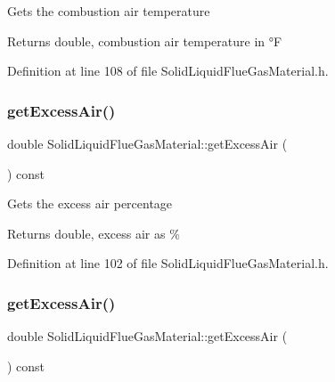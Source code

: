 Gets the combustion air temperature \begin{DoxyReturn}{Returns}
double, combustion air temperature in °F 
\end{DoxyReturn}


Definition at line 108 of file Solid\+Liquid\+Flue\+Gas\+Material.\+h.

\mbox{\label{class_solid_liquid_flue_gas_material_a49e7bb4ebc45897c81b6f38610ceaf02}} 
\subsubsection{\texorpdfstring{get\+Excess\+Air()}{getExcessAir()}\hspace{0.1cm}{\footnotesize\ttfamily [1/3]}}
{\footnotesize\ttfamily double Solid\+Liquid\+Flue\+Gas\+Material\+::get\+Excess\+Air (\begin{DoxyParamCaption}{ }\end{DoxyParamCaption}) const\hspace{0.3cm}{\ttfamily [inline]}}

Gets the excess air percentage \begin{DoxyReturn}{Returns}
double, excess air as \% 
\end{DoxyReturn}


Definition at line 102 of file Solid\+Liquid\+Flue\+Gas\+Material.\+h.

\mbox{\label{class_solid_liquid_flue_gas_material_a49e7bb4ebc45897c81b6f38610ceaf02}} 
\subsubsection{\texorpdfstring{get\+Excess\+Air()}{getExcessAir()}\hspace{0.1cm}{\footnotesize\ttfamily [2/3]}}
{\footnotesize\ttfamily double Solid\+Liquid\+Flue\+Gas\+Material\+::get\+Excess\+Air (\begin{DoxyParamCaption}{ }\end{DoxyParamCaption}) const\hspace{0.3cm}{\ttfamily [inline]}}

